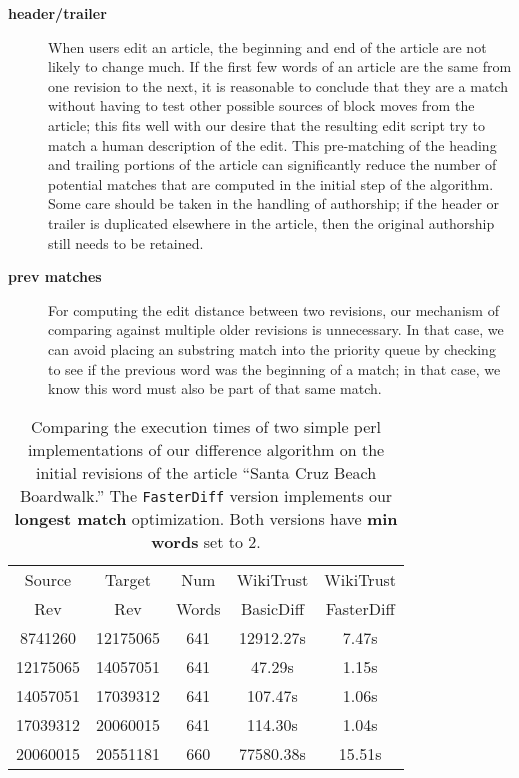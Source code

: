 \begin{description}
\item[\textbf{header/trailer}] When users edit an article, the beginning
    and end of the article are not likely to change much.
    If the first few words of an article are the same from one revision to
    the next, it is reasonable to conclude that they are a match
    without having to test other possible sources of block moves
    from the article; this fits well with our desire that the resulting
    edit script try to match a human description of the edit.
    This pre-matching of the heading and trailing portions of the
    article can significantly reduce the number of potential matches
    that are computed in the initial step of the algorithm.
    Some care should be taken in the handling of authorship;
    if the header or trailer is duplicated elsewhere in the article,
    then the original authorship still needs to be retained.

\item[\textbf{prev matches}]
    For computing the edit distance between two revisions,
    our mechanism of comparing against multiple older revisions
    is unnecessary.
    In that case, we can avoid placing an substring match
    into the priority queue by checking to see if the previous
    word was the beginning of a match; in that case, we know this
    word must also be part of that same match.

\end{description}

\begin{table}
\begin{center}
\begin{tabular}{| c | c || c || c | c |}
\hline
Source & Target & Num & WikiTrust & WikiTrust \\
Rev & Rev & Words & BasicDiff & FasterDiff \\
\hline
8741260 & 12175065 & 641 & 12912.27s & 7.47s \\
12175065 & 14057051 & 641 & 47.29s & 1.15s \\
14057051 & 17039312 & 641 & 107.47s & 1.06s \\
17039312 & 20060015 & 641 & 114.30s & 1.04s \\
20060015 & 20551181 & 660 & 77580.38s & 15.51s \\
\hline
\end{tabular}
\end{center}
\caption{Comparing the execution times of two simple perl
    implementations of our difference  algorithm
    on the initial revisions of the article ``Santa Cruz Beach Boardwalk.''
    The \texttt{FasterDiff} version implements our
    \textbf{longest match} optimization.
    Both versions have \textbf{min words} set to 2.
    }
\label{tab:comparediff}
\end{table}

